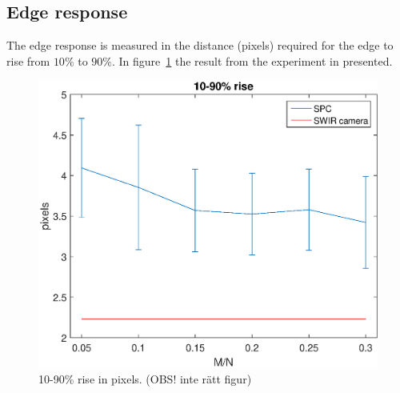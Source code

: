 \subsection{Edge response}
The edge response is measured in the distance (pixels) required for the edge to rise from $10\%$ to $90\%$. In figure~\ref{fig:rise} the result from the experiment in presented. 

\begin{figure}[H]
    \centering
    \includegraphics[width=0.5\linewidth]{result/mtf/10-90_rise.eps}
    \caption{10-90\% rise in pixels. (OBS! inte rätt figur)}
    \label{fig:rise}
\end{figure}






